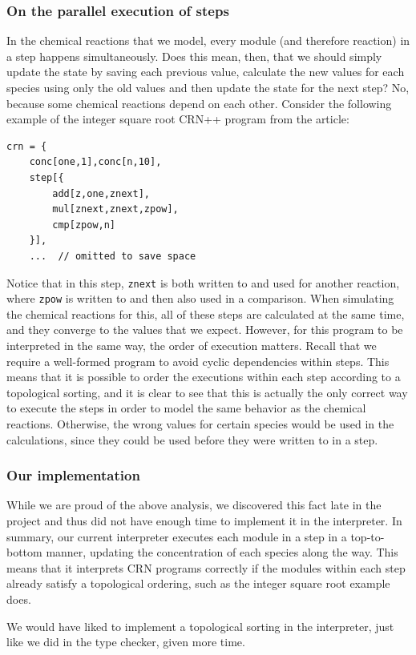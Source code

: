 \subsubsection{On the parallel execution of steps}
In the chemical reactions that we model, every module (and therefore reaction) in a step happens simultaneously. Does this mean, then, that we should simply update the state by saving each previous value, calculate the new values for each species using only the old values and then update the state for the next step? No, because some chemical reactions depend on each other. Consider the following example of the integer square root CRN++ program from the article:
\begin{verbatim}
crn = {
    conc[one,1],conc[n,10],
    step[{
        add[z,one,znext],
        mul[znext,znext,zpow],
        cmp[zpow,n]
    }],
    ...  // omitted to save space
\end{verbatim}

Notice that in this step, \texttt{znext} is both written to and used for another reaction, where \texttt{zpow} is written to and then also used in a comparison. When simulating the chemical reactions for this, all of these steps are calculated at the same time, and they converge to the values that we expect. However, for this program to be interpreted in the same way, the order of execution matters. Recall that we require a well-formed program to avoid cyclic dependencies within steps. This means that it is possible to order the executions within each step according to a topological sorting, and it is clear to see that this is actually the only correct way to execute the steps in order to model the same behavior as the chemical reactions. Otherwise, the wrong values for certain species would be used in the calculations, since they could be used before they were written to in a step. 

\subsubsection{Our implementation}
While we are proud of the above analysis, we discovered this fact late in the project and thus did not have enough time to implement it in the interpreter. In summary, our current interpreter executes each module in a step in a top-to-bottom manner, updating the concentration of each species along the way. This means that it interprets CRN programs correctly if the modules within each step already satisfy a topological ordering, such as the integer square root example does. 

We would have liked to implement a topological sorting in the interpreter, just like we did in the type checker, given more time. 
